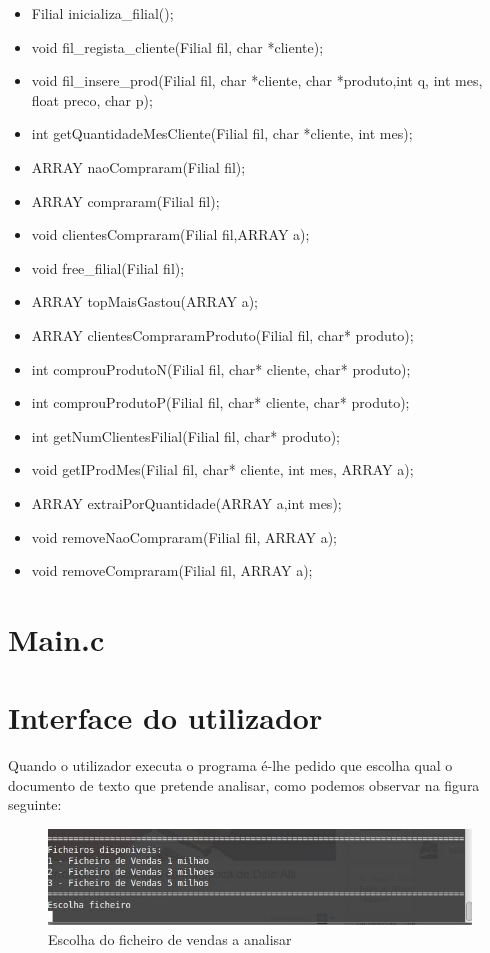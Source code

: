 \begin{itemize}
\item	Filial inicializa\_filial();
\item	void fil\_regista\_cliente(Filial fil, char *cliente);
\item	void fil\_insere\_prod(Filial fil, char *cliente, char *produto,int q, int mes, float preco, char p);
\item	int getQuantidadeMesCliente(Filial fil, char *cliente, int mes);
\item	ARRAY naoCompraram(Filial fil);
\item	ARRAY compraram(Filial fil);
\item	void clientesCompraram(Filial fil,ARRAY a);
\item	void free\_filial(Filial fil);
\item	ARRAY topMaisGastou(ARRAY a);
\item	ARRAY clientesCompraramProduto(Filial fil, char* produto);
\item	int comprouProdutoN(Filial fil, char* cliente, char* produto);
\item	int comprouProdutoP(Filial fil, char* cliente, char* produto);
\item	int getNumClientesFilial(Filial fil, char* produto);
\item	void getIProdMes(Filial fil, char* cliente, int mes, ARRAY a);
\item	ARRAY extraiPorQuantidade(ARRAY a,int mes);
\item	void removeNaoCompraram(Filial fil, ARRAY a);
\item	void removeCompraram(Filial fil, ARRAY a);
\end{itemize}


\chapter{Main.c}




\chapter{Interface do utilizador}
Quando o utilizador executa o programa é-lhe pedido que escolha qual o documento de texto que pretende analisar, como podemos observar na figura seguinte: 

\begin{figure}[h!]
	\centering
	\includegraphics[scale=0.4]{1querie.png}  
	\caption{Escolha do ficheiro de vendas a analisar}  
\end{figure}

